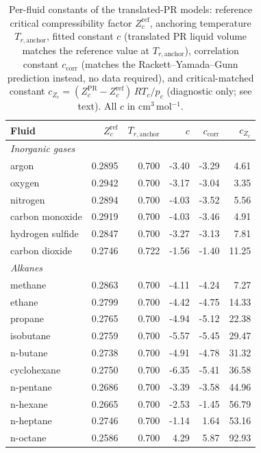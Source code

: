 \begin{table}[H]
\centering
\caption{Per-fluid constants of the translated-PR models: reference critical compressibility factor $Z_c^{\mathrm{ref}}$, anchoring temperature $T_{r,\mathrm{anchor}}$, fitted constant $c$ (translated PR liquid volume matches the reference value at $T_{r,\mathrm{anchor}}$), correlation constant $c_{\mathrm{corr}}$ (matches the Rackett--Yamada--Gunn prediction instead, no data required), and critical-matched constant $c_{Z_c} = (Z_c^{\mathrm{PR}} - Z_c^{\mathrm{ref}})\,R T_c/p_c$ (diagnostic only; see text). All $c$ in cm$^3$\,mol$^{-1}$.}
\label{tab:vt}
\footnotesize
\setlength{\tabcolsep}{4.5pt}
\begin{tabular}{lrrrrr}
\toprule
Fluid & $Z_c^{\mathrm{ref}}$ & $T_{r,\mathrm{anchor}}$ & $c$ & $c_{\mathrm{corr}}$ & $c_{Z_c}$ \\
\midrule
\multicolumn{6}{l}{\itshape Inorganic gases}\\
\quad argon & 0.2895 & 0.700 & -3.40 & -3.29 & 4.61 \\
\quad oxygen & 0.2942 & 0.700 & -3.17 & -3.04 & 3.35 \\
\quad nitrogen & 0.2894 & 0.700 & -4.03 & -3.52 & 5.56 \\
\quad carbon monoxide & 0.2919 & 0.700 & -4.03 & -3.46 & 4.91 \\
\quad hydrogen sulfide & 0.2847 & 0.700 & -3.27 & -3.13 & 7.81 \\
\quad carbon dioxide & 0.2746 & 0.722 & -1.56 & -1.40 & 11.25 \\
\multicolumn{6}{l}{\itshape Alkanes}\\
\quad methane & 0.2863 & 0.700 & -4.11 & -4.24 & 7.27 \\
\quad ethane & 0.2799 & 0.700 & -4.42 & -4.75 & 14.33 \\
\quad propane & 0.2765 & 0.700 & -4.94 & -5.12 & 22.38 \\
\quad isobutane & 0.2759 & 0.700 & -5.57 & -5.45 & 29.47 \\
\quad n-butane & 0.2738 & 0.700 & -4.91 & -4.78 & 31.32 \\
\quad cyclohexane & 0.2750 & 0.700 & -6.35 & -5.41 & 36.58 \\
\quad n-pentane & 0.2686 & 0.700 & -3.39 & -3.58 & 44.96 \\
\quad n-hexane & 0.2665 & 0.700 & -2.53 & -1.45 & 56.79 \\
\quad n-heptane & 0.2746 & 0.700 & -1.14 & 1.64 & 53.16 \\
\quad n-octane & 0.2586 & 0.700 & 4.29 & 5.87 & 92.93 \\

\end{tabular}
\end{table}
